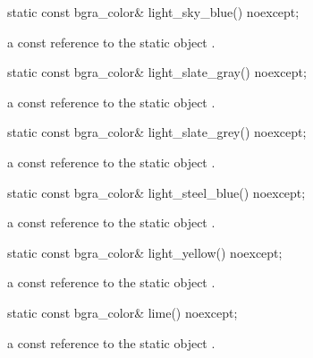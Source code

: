 \begin{itemdecl}
static const bgra_color& light_sky_blue() noexcept;
\end{itemdecl}
\begin{itemdescr}
\pnum
\returns
a const reference to the static  object .
\end{itemdescr}

\begin{itemdecl}
static const bgra_color& light_slate_gray() noexcept;
\end{itemdecl}
\begin{itemdescr}
\pnum
\returns
a const reference to the static  object .
\end{itemdescr}

\begin{itemdecl}
static const bgra_color& light_slate_grey() noexcept;
\end{itemdecl}
\begin{itemdescr}
\pnum
\returns
a const reference to the static  object .
\end{itemdescr}

\begin{itemdecl}
static const bgra_color& light_steel_blue() noexcept;
\end{itemdecl}
\begin{itemdescr}
\pnum
\returns
a const reference to the static  object .
\end{itemdescr}

\begin{itemdecl}
static const bgra_color& light_yellow() noexcept;
\end{itemdecl}
\begin{itemdescr}
\pnum
\returns
a const reference to the static  object .
\end{itemdescr}

\begin{itemdecl}
static const bgra_color& lime() noexcept;
\end{itemdecl}
\begin{itemdescr}
\pnum
\returns
a const reference to the static  object .
\end{itemdescr}

